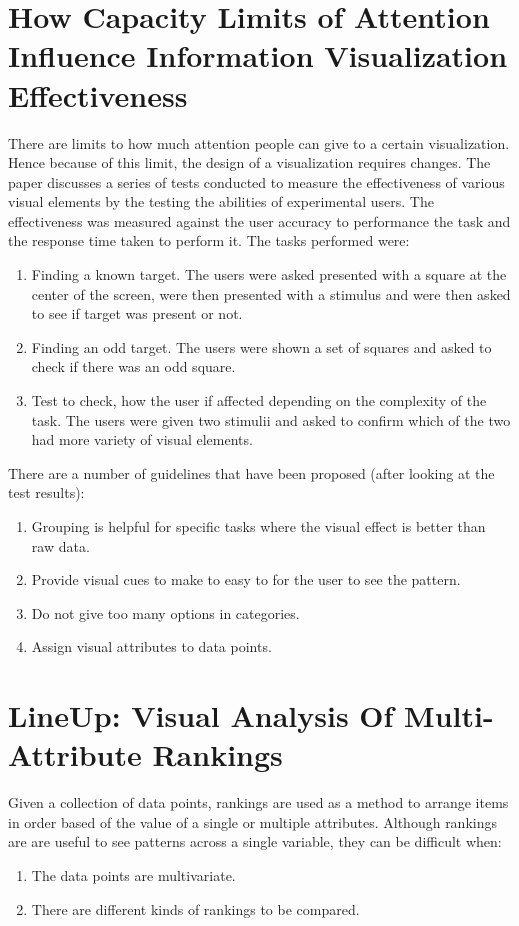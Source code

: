 \documentclass[paper=a4, fontsize=11pt]{scrartcl}
\numberwithin{equation}{section} %
\numberwithin{figure}{section} %
\numberwithin{table}{section} %
\begin{document}
\section{How Capacity Limits of Attention Influence Information Visualization Effectiveness~\cite{haroz2012capacity}}
There are limits to how much attention people can give to a certain visualization. Hence because of this limit, the design of a visualization requires changes. The paper discusses a series of tests conducted to measure the effectiveness of various visual elements by the testing the abilities of experimental users. The effectiveness was measured against the user accuracy to performance the task and the response time taken to perform it. The tasks performed were:
\begin{enumerate}
\item Finding a known target. The users were asked presented with a square at the center of the screen, were then presented with a stimulus and were then asked to see if target was present or not.
\item Finding an odd target. The users were shown a set of squares and asked to check if there was an odd square.
\item Test to check, how the user if affected depending on the complexity of the task. The users were given two stimulii and asked to confirm which of the two had more variety of visual elements.
\end{enumerate}
There are a number of guidelines that have been proposed (after looking at the test results):
\begin{enumerate}
\item Grouping is helpful for specific tasks where the visual effect is better than raw data.
\item Provide visual cues to make to easy to for the user to see the pattern.
\item Do not give too many options in categories.
\item Assign visual attributes to data points.
\end{enumerate}

\section{LineUp: Visual Analysis Of Multi-Attribute Rankings~\cite{gratzl2013lineup}}
Given a collection of data points, rankings are used as a method to arrange items in order based of the value of a single or multiple attributes. Although rankings are are useful to see patterns across a single variable, they can be difficult when:
\begin{enumerate}
\item The data points are multivariate.
\item There are different kinds of rankings to be compared.
\end{enumerate}
\end{document}

